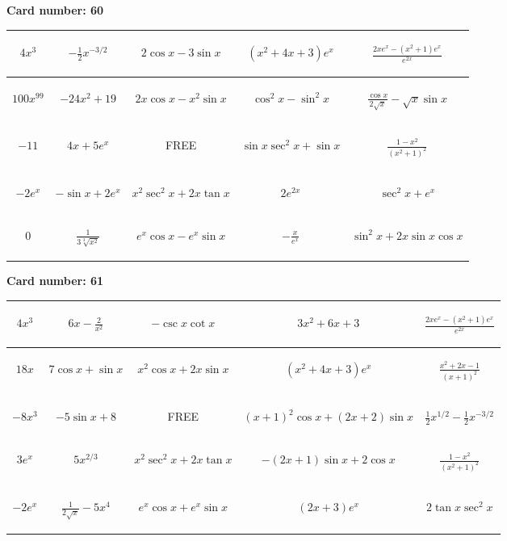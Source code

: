 \documentclass{article}
\newcommand{\entry}[1]{\begin{minipage}[t][2.75cm][t]{4cm} \vspace{1cm} \begin{center}#1\end{center} \end{minipage}}
\newcommand{\freespace}{\entry{FREE}}
\newcommand{\cardnumber}[1]{\noindent \textbf{Card number: #1} \bigskip}
\begin{document}
\pagebreak

\cardnumber{60}
\begin{center}
\begin{tabular}{|*{5}{c|}}
    \hline
    \entry{$4x^3$} & \entry{$-\frac{1}{2} x^{-3/2}$} & \entry{$2 \cos x - 3 \sin x$} & \entry{$(x^2 + 4x + 3) e^x$} & \entry{$\frac{2x e^x - (x^2 + 1) e^x}{e^{2x}}$} \\ \hline
    \entry{$100x^{99}$} & \entry{$-24x^2 + 19$} & \entry{$2x \cos x - x^2 \sin x$} & \entry{$\cos^2 x - \sin^2 x$} & \entry{$\frac{\cos x}{2 \sqrt{x}} - \sqrt{x} \sin x$} \\ \hline
    \entry{$-11$} & \entry{$4x + 5e^x$} & \freespace & \entry{$\sin x \sec^2 x + \sin x$} & \entry{$\frac{1 - x^2}{(x^2 + 1)^2}$} \\ \hline
    \entry{$-2e^x$} & \entry{$-\sin x + 2e^x$} & \entry{$x^2 \sec^2 x + 2x \tan x$} & \entry{$2e^{2x}$} & \entry{$\sec^2 x + e^x$} \\ \hline
    \entry{$0$} & \entry{$\frac{1}{3\sqrt[3]{x^2}}$} & \entry{$e^x \cos x - e^x \sin x$} & \entry{$-\frac{x}{e^x}$} & \entry{$\sin^2 x + 2x \sin x \cos x$} \\ \hline
\end{tabular}
\end{center}

\pagebreak

\cardnumber{61}
\begin{center}
\begin{tabular}{|*{5}{c|}}
    \hline
    \entry{$4x^3$} & \entry{$6x - \frac{2}{x^2}$} & \entry{$-\csc x \cot x$} & \entry{$3x^2 + 6x + 3$} & \entry{$\frac{2x e^x - (x^2 + 1) e^x}{e^{2x}}$} \\ \hline
    \entry{$18x$} & \entry{$7 \cos x + \sin x$} & \entry{$x^2 \cos x + 2x \sin x$} & \entry{$(x^2 + 4x + 3) e^x$} & \entry{$\frac{x^2 + 2x - 1}{(x + 1)^2}$} \\ \hline
    \entry{$-8x^3$} & \entry{$-5 \sin x + 8$} & \freespace & \entry{$(x + 1)^2 \cos x + (2x + 2) \sin x$} & \entry{$\frac{1}{2} x^{1/2} - \frac{1}{2} x^{-3/2}$} \\ \hline
    \entry{$3e^x$} & \entry{$5x^{2/3}$} & \entry{$x^2 \sec^2 x + 2x \tan x$} & \entry{$-(2x + 1) \sin x + 2 \cos x$} & \entry{$\frac{1 - x^2}{(x^2 + 1)^2}$} \\ \hline
    \entry{$-2e^x$} & \entry{$\frac{1}{2\sqrt{x}} - 5x^4$} & \entry{$e^x \cos x + e^x \sin x$} & \entry{$(2x + 3) e^x$} & \entry{$2 \tan x \sec^2 x$} \\ \hline
\end{tabular}
\end{center}
\end{document}
